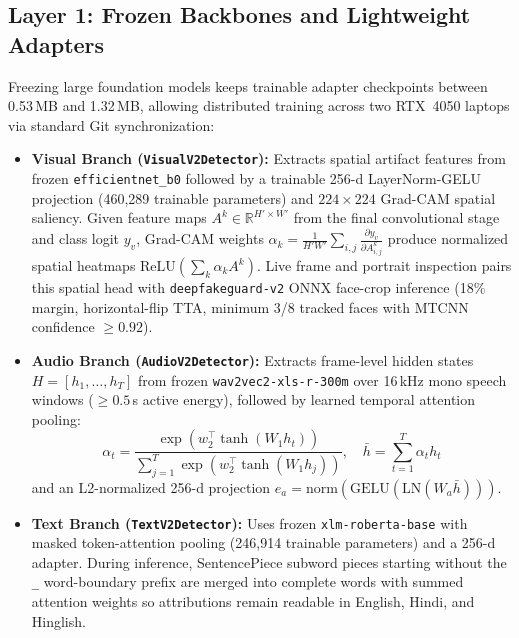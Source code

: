 \documentclass[conference]{IEEEtran}
\begin{document}
\subsection{Layer 1: Frozen Backbones and Lightweight Adapters}
Freezing large foundation models keeps trainable adapter checkpoints between 0.53\,MB and 1.32\,MB, allowing distributed training across two RTX~4050 laptops via standard Git synchronization:
\begin{itemize}
\item \textbf{Visual Branch (\texttt{VisualV2Detector}):} Extracts spatial artifact features from frozen \texttt{efficientnet\_b0} followed by a trainable 256-d LayerNorm-GELU projection (460,289 trainable parameters) and $224\times224$ Grad-CAM spatial saliency. Given feature maps $A^k \in \mathbb{R}^{H'\times W'}$ from the final convolutional stage and class logit $y_v$, Grad-CAM weights $\alpha_k = \frac{1}{H'W'}\sum_{i,j}\frac{\partial y_v}{\partial A^k_{i,j}}$ produce normalized spatial heatmaps $\text{ReLU}(\sum_k \alpha_k A^k)$. Live frame and portrait inspection pairs this spatial head with \texttt{deepfakeguard-v2} ONNX face-crop inference (18\% margin, horizontal-flip TTA, minimum 3/8 tracked faces with MTCNN confidence $\ge 0.92$).
\item \textbf{Audio Branch (\texttt{AudioV2Detector}):} Extracts frame-level hidden states $H = [h_1, \dots, h_T]$ from frozen \texttt{wav2vec2-xls-r-300m} over 16\,kHz mono speech windows ($\ge 0.5$\,s active energy), followed by learned temporal attention pooling:
\begin{equation}
\alpha_t = \frac{\exp(w_2^\top \tanh(W_1 h_t))}{\sum_{j=1}^{T}\exp(w_2^\top \tanh(W_1 h_j))}, \quad \bar{h} = \sum_{t=1}^{T}\alpha_t h_t
\end{equation}
and an L2-normalized 256-d projection $e_a = \text{norm}(\text{GELU}(\text{LN}(W_a \bar{h})))$.
\item \textbf{Text Branch (\texttt{TextV2Detector}):} Uses frozen \texttt{xlm-roberta-base} with masked token-attention pooling (246,914 trainable parameters) and a 256-d adapter. During inference, SentencePiece subword pieces starting without the \texttt{\_} word-boundary prefix are merged into complete words with summed attention weights so attributions remain readable in English, Hindi, and Hinglish.
\end{itemize}
\end{document}
